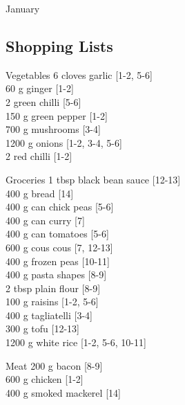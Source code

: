 \begin{menu}{January}
    \subsection*{Shopping Lists}
      \begin{shoppinglist}{Vegetables}
      6 cloves garlic {\scriptsize[1-2, 5-6]}\\
      60 g ginger {\scriptsize[1-2]}\\
      2  green chilli {\scriptsize[5-6]}\\
      150 g green pepper {\scriptsize[1-2]}\\
      700 g mushrooms {\scriptsize[3-4]}\\
      1200 g onions {\scriptsize[1-2, 3-4, 5-6]}\\
      2  red chilli {\scriptsize[1-2]}\\
      \end{shoppinglist}%
      \begin{shoppinglist}{Groceries}
      1 tbsp black bean sauce {\scriptsize[12-13]}\\
      400 g bread {\scriptsize[14]}\\
      400 g can chick peas {\scriptsize[5-6]}\\
      400 g can curry {\scriptsize[7]}\\
      400 g can tomatoes {\scriptsize[5-6]}\\
      600 g cous cous {\scriptsize[7, 12-13]}\\
      400 g frozen peas {\scriptsize[10-11]}\\
      400 g pasta shapes {\scriptsize[8-9]}\\
      2 tbsp plain flour {\scriptsize[8-9]}\\
      100 g raisins {\scriptsize[1-2, 5-6]}\\
      400 g tagliatelli {\scriptsize[3-4]}\\
      300 g tofu {\scriptsize[12-13]}\\
      1200 g white rice {\scriptsize[1-2, 5-6, 10-11]}\\
      \end{shoppinglist}%
      \par\vfil %
      \begin{shoppinglist}{Meat}
      200 g bacon {\scriptsize[8-9]}\\
      600 g chicken {\scriptsize[1-2]}\\
      400 g smoked mackerel {\scriptsize[14]}\\

\end{shoppinglist}
\end{menu}
